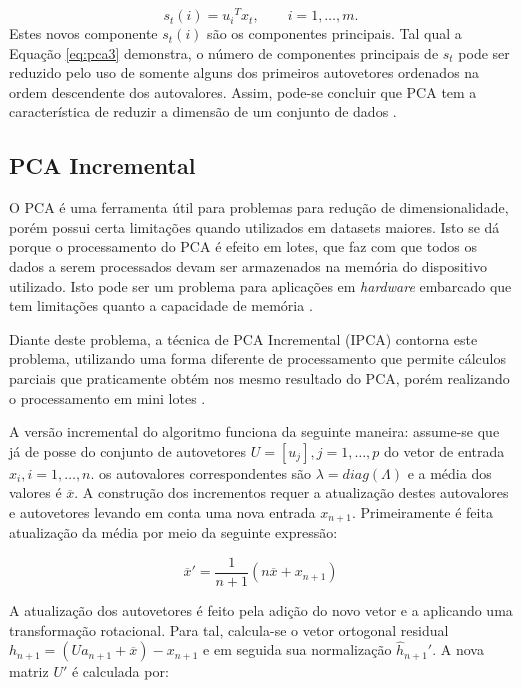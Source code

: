 \begin{equation}\label{eq:pca3}
	{s_t}(i) = {u_i}^T{x_t}, \qquad i=1,\ldots,m.
\end{equation}
Estes novos componente ${s_t}(i)$ são os componentes principais. Tal qual a Equação \ref{eq:pca3} demonstra, o número de componentes principais de $s_t$ pode ser reduzido pelo uso de somente alguns dos primeiros autovetores ordenados na ordem descendente dos autovalores. Assim, pode-se concluir que PCA tem a característica de reduzir a dimensão de um conjunto de dados \cite{cao2003comparison}. 

\subsection{PCA Incremental}

O PCA é uma ferramenta útil para problemas para redução de dimensionalidade, porém possui certa limitações quando utilizados em datasets maiores. Isto se dá porque o processamento do PCA é efeito em lotes, que faz com que todos os dados a serem processados devam ser armazenados na memória do dispositivo utilizado. Isto pode ser um problema para aplicações em \textit{hardware} embarcado que tem limitações quanto a capacidade de memória \cite{scikit-learn}.

Diante deste problema, a técnica de PCA Incremental (IPCA) contorna este problema, utilizando uma forma diferente de processamento  que permite cálculos parciais que praticamente obtém nos mesmo resultado do PCA, porém realizando o processamento em mini lotes \cite{Weng2003}.

A versão incremental do algoritmo funciona da seguinte maneira: assume-se que já de posse do conjunto de autovetores $U = [u_j], j = 1,\ldots, p$ do vetor de entrada $x_i, i = 1,\ldots,n$. os autovalores correspondentes são $\lambda = diag(\Lambda)$ e a média dos valores é $\overline{x}$. A construção dos incrementos requer a atualização destes autovalores e autovetores levando em conta uma nova entrada $x_{n+1}$. Primeiramente é feita atualização da média por meio da seguinte expressão\cite{Artac2002}:

\begin{equation}\label{eq:ipca1}
	\overline{x}' = \frac{1}{n+1}(n\overline{x} + x_{n+1})
\end{equation}

A atualização dos autovetores é feito pela adição do novo vetor e a aplicando uma transformação rotacional. Para tal, calcula-se o vetor ortogonal residual $h_{n+1} = (Ua_{n+1} + \overline{x})-x_{n+1}$ e em seguida sua normalização $\hat{h}_{n+1}'$. A nova matriz $U'$ é calculada por:

